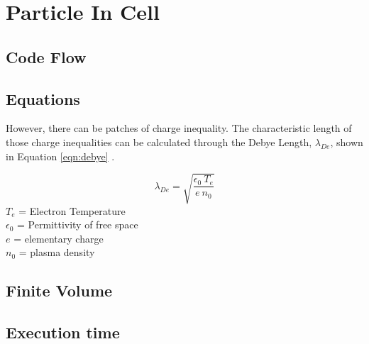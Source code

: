 \section{Particle In Cell}
\subsection{Code Flow}
\subsection{Equations}

However, there can be patches of charge inequality. The characteristic length of those charge inequalities can be calculated through the Debye Length, \(\lambda_{De}\), shown in Equation \ref{eqn:debye} \cite{debye}. \par


\begin{equation}
    \label{eqn:debye}
    \lambda_{De} = \sqrt{\frac{\epsilon_0 \: T_e}{e \: n_0}}
\end{equation}
\(T_e\) = Electron Temperature \\
\(\epsilon_0\) = Permittivity of free space \\
\(e\) = elementary charge \\
\(n_0\) = plasma density \par

\subsection{Finite Volume}
\subsection{Execution time}
